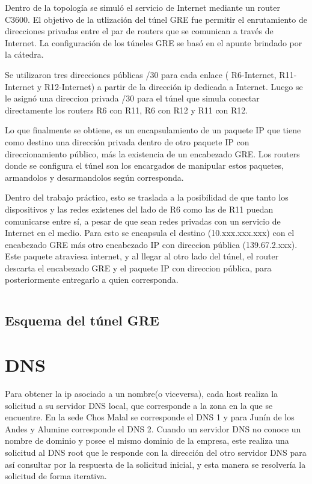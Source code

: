 \documentclass[12pt,a4paper,spanish]{article}
\begin{document}
Dentro de la topología se simuló el servicio de Internet mediante un router C3600. El objetivo de la utlización del túnel GRE fue permitir el enrutamiento de direcciones privadas entre el par de routers que se comunican a través de Internet. La configuración de los túneles GRE se basó en el apunte brindado por la cátedra. 

Se utilizaron tres direcciones públicas /30 para cada enlace ( R6-Internet, R11-Internet y R12-Internet) a partir de la dirección ip dedicada a Internet. Luego se le asignó una direccion privada /30 para el túnel que simula conectar directamente los routers R6 con R11, R6 con R12 y R11 con R12. 

Lo que finalmente se obtiene, es un encapsulamiento de un paquete IP que tiene como destino una dirección privada dentro de otro paquete IP con direccionamiento público, más la existencia de un encabezado GRE. Los routers donde se configura el túnel son los encargados de manipular estos paquetes, armandolos y desarmandolos según corresponda.

Dentro del trabajo práctico, esto se traslada a la posibilidad de que tanto los dispositivos y las redes existenes del lado de R6 como las de R11 puedan comunicarse entre sí, a pesar de que sean redes privadas con un servicio de Internet en el medio. Para esto se encapsula el destino (10.xxx.xxx.xxx) con el encabezado GRE más otro encabezado IP con direccion pública (139.67.2.xxx). Este paquete atraviesa internet, y al llegar al otro lado del túnel, el router descarta el encabezado GRE y el paquete IP con direccion pública, para posteriormente entregarlo a quien corresponda.

{\small
\begin{verbatim}

\end{verbatim}
}

\subsection{Esquema del túnel GRE}

\newpage


\newpage
\section{DNS}
Para obtener la ip asociado a un nombre(o viceversa), cada host realiza la solicitud a su servidor DNS local, que corresponde a la zona en la que se encuentre. En la sede Chos Malal se corresponde el DNS 1 y para Junín de los Andes y Alumine corresponde el DNS 2. Cuando un servidor DNS no conoce un nombre de dominio y posee el mismo dominio de la empresa, este realiza una solicitud al DNS root que le responde con la dirección del otro servidor DNS para así consultar por la respuesta de la solicitud inicial, y esta manera se resolvería la solicitud de forma iterativa.
\end{document}
